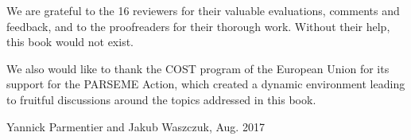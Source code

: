 \begin{refsection}

We are grateful to the 16 reviewers for their valuable evaluations,
comments and feedback, and to the proofreaders for their thorough
work. Without their help, this book would not exist.

We also would like to thank the COST program of the European Union for
its support for the PARSEME Action, which created a dynamic environment
leading to fruitful discussions around the topics addressed in this
book.

\begin{flushright}
  Yannick Parmentier and Jakub Waszczuk, Aug. 2017
\end{flushright}

\printbibliography[heading=subbibliography]
\end{refsection}

